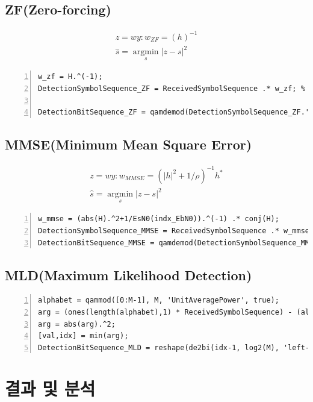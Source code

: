 \documentclass{article}
\providecommand{\abs}[1]{\lvert#1\rvert}
\begin{document}
\subsection{ZF(Zero-forcing)}
\begin{gather}
z=wy : w_{ZF}=(h)^{-1}\\
\hat{s}=\operatorname*{argmin}_s \abs{z-s}^2
\end{gather}
\begin{lstlisting}[style=Matlab-editor, frame=single, numbers=left,]
w_zf = H.^(-1);
DetectionSymbolSequence_ZF = ReceivedSymbolSequence .* w_zf; % Detection (Zero-Forcing: y / h)

DetectionBitSequence_ZF = qamdemod(DetectionSymbolSequence_ZF.', M, 'OutputType', 'bit', 'UnitAveragePower', 1)';
\end{lstlisting}
\subsection{MMSE(Minimum Mean Square Error)}
\begin{gather}
z=wy : w_{MMSE}=(\abs{h}^2+1/\rho)^{-1}h^*\\
\hat{s}=\operatorname*{argmin}_s \abs{z-s}^2
\end{gather}
\begin{lstlisting}[style=Matlab-editor, frame=single, numbers=left,]
w_mmse = (abs(H).^2+1/EsN0(indx_EbN0)).^(-1) .* conj(H);
DetectionSymbolSequence_MMSE = ReceivedSymbolSequence .* w_mmse;
DetectionBitSequence_MMSE = qamdemod(DetectionSymbolSequence_MMSE.', M, 'OutputType', 'bit', 'UnitAveragePower', 1)';
\end{lstlisting}
\subsection{MLD(Maximum Likelihood Detection)}
\begin{lstlisting}[style=Matlab-editor, frame=single, numbers=left,]
alphabet = qammod([0:M-1], M, 'UnitAveragePower', true);
arg = (ones(length(alphabet),1) * ReceivedSymbolSequence) - (alphabet.' * H);
arg = abs(arg).^2;
[val,idx] = min(arg);
DetectionBitSequence_MLD = reshape(de2bi(idx-1, log2(M), 'left-msb')', 1, []);
\end{lstlisting}
\section{결과 및 분석}
\end{document}
